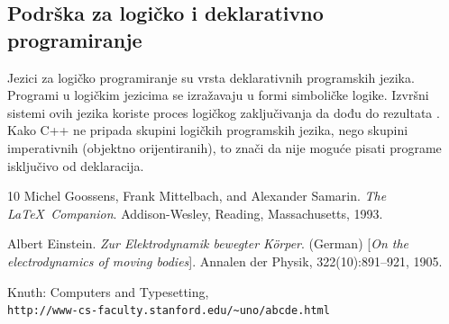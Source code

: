 \documentclass[11pt]{book}
\begin{document}
\subsection{Podrška za logičko i deklarativno programiranje}

Jezici za logičko programiranje su vrsta deklarativnih programskih jezika. Programi u
logičkim jezicima se izražavaju u formi simboličke logike. Izvršni sistemi ovih jezika koriste proces logičkog zaključivanja da dođu do rezultata . Kako C++ ne pripada skupini logičkih programskih jezika, nego skupini imperativnih (objektno orijentiranih), to znači da nije moguće pisati programe isključivo od deklaracija.

\begin{thebibliography}{10} %
  Michel Goossens, Frank Mittelbach, and Alexander Samarin.
  \textit{The \LaTeX\ Companion}.
  Addison-Wesley, Reading, Massachusetts, 1993.

  Albert Einstein.
  \textit{Zur Elektrodynamik bewegter K{\"o}rper}. (German)
    [\textit{On the electrodynamics of moving bodies}].
  Annalen der Physik, 322(10):891–921, 1905.

  Knuth: Computers and Typesetting,
  \\\texttt{http://www-cs-faculty.stanford.edu/\~{}uno/abcde.html}
\end{thebibliography}
\end{document}
